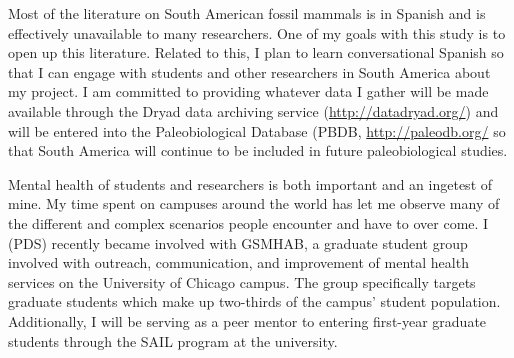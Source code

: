 \documentclass[11pt,letterpaper]{article}
\begin{document}
Most of the literature on South American fossil mammals is in Spanish and is effectively unavailable to many researchers. One of my goals with this study is to open up this literature. Related to this, I plan to learn conversational Spanish so that I can engage with students and other researchers in South America about my project. I am committed to providing whatever data I gather will be made available through the Dryad data archiving service (\url{http://datadryad.org/}) and will be entered into the Paleobiological Database (PBDB, \url{http://paleodb.org/} so that South America will continue to be included in future paleobiological studies. 

Mental health of students and researchers is both important and an ingetest of mine. My time spent on campuses around the world has let me observe many of the different and complex scenarios people encounter and have to over come. I (PDS) recently became involved with GSMHAB, a graduate student group involved with outreach, communication, and improvement of mental health services on the University of Chicago campus. The group specifically targets graduate students which make up two-thirds of the campus' student population. Additionally, I will be serving as a peer mentor to entering first-year graduate students through the SAIL program at the university.




\end{document}
